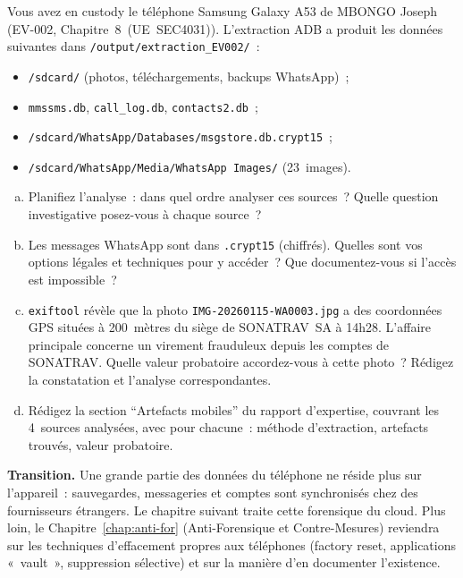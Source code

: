 \begin{boxexo}[title={\ding{45}\quad Exercice~16.3. Investigation mobile complète \niveauexpert}]
Vous avez en custody le téléphone Samsung Galaxy A53 de MBONGO Joseph
(EV-002, Chapitre~8~(UE~SEC4031)). L'extraction ADB a produit
les données suivantes dans \texttt{/output/extraction\_EV002/}~:
\begin{itemize}
    \item \texttt{/sdcard/} (photos, téléchargements, backups WhatsApp)~;
    \item \texttt{mmssms.db}, \texttt{call\_log.db}, \texttt{contacts2.db}~;
    \item \texttt{/sdcard/WhatsApp/Databases/msgstore.db.crypt15}~;
    \item \texttt{/sdcard/WhatsApp/Media/WhatsApp Images/} (23~images).
\end{itemize}
\begin{enumerate}[(a)]
    \item Planifiez l'analyse~: dans quel ordre analyser ces sources~?
          Quelle question investigative posez-vous à chaque source~?
    \item Les messages WhatsApp sont dans \texttt{.crypt15} (chiffrés).
          Quelles sont vos options légales et techniques pour y accéder~?
          Que documentez-vous si l'accès est impossible~?
    \item \texttt{exiftool} révèle que la photo
          \texttt{IMG-20260115-WA0003.jpg} a des coordonnées GPS
          situées à 200~mètres du siège de SONATRAV~SA à 14h28.
          L'affaire principale concerne un virement frauduleux
          depuis les comptes de SONATRAV. Quelle valeur probatoire
          accordez-vous à cette photo~? Rédigez la constatation et
          l'analyse correspondantes.
    \item Rédigez la section ``Artefacts mobiles'' du rapport d'expertise,
          couvrant les 4~sources analysées, avec pour chacune~:
          méthode d'extraction, artefacts trouvés, valeur probatoire.
\end{enumerate}
\end{boxexo}

\bigskip

\begin{boxinfo}
\textbf{Transition.} Une grande partie des données du téléphone
ne réside plus sur l'appareil~: sauvegardes, messageries et comptes
sont synchronisés chez des fournisseurs étrangers. Le chapitre
suivant traite cette forensique du cloud. Plus loin, le
Chapitre~\ref{chap:anti-for} (Anti-Forensique et Contre-Mesures)
reviendra sur les techniques d'effacement propres aux téléphones
(factory reset, applications «~vault~», suppression sélective) et
sur la manière d'en documenter l'existence.
\end{boxinfo}
